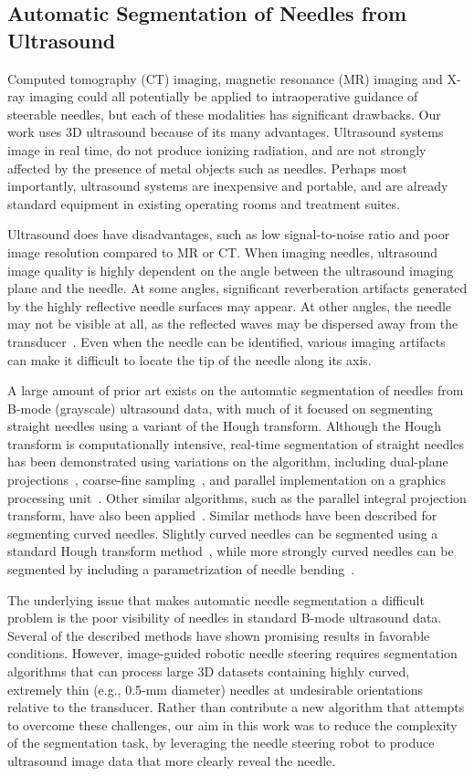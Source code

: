 \subsection{Automatic Segmentation of Needles from Ultrasound}
Computed tomography (CT) imaging, magnetic resonance (MR) imaging and X-ray imaging could all potentially be applied to intraoperative guidance of steerable needles, but each of these modalities has significant drawbacks. Our work uses 3D ultrasound because of its many advantages. Ultrasound systems image in real time, do not produce ionizing radiation, and are not strongly affected by the presence of metal objects such as needles. Perhaps most importantly, ultrasound systems are inexpensive and portable, and are already standard equipment in existing operating rooms and treatment suites.  

Ultrasound does have disadvantages, such as low signal-to-noise ratio and poor image resolution compared to MR or CT. When imaging needles, ultrasound image quality is highly dependent on the angle between the ultrasound imaging plane and the needle. At some angles, significant reverberation artifacts generated by the highly reflective needle surfaces may appear. At other angles, the needle may not be visible at all, as the reflected waves may be dispersed away from the transducer~\cite{Chung2004}. Even when the needle can be identified, various imaging artifacts can make it difficult to locate the tip of the needle along its axis. 

A large amount of prior art exists on the automatic segmentation of needles from B-mode (grayscale) ultrasound data, with much of it focused on segmenting straight needles using a variant of the Hough transform. Although the Hough transform is computationally intensive, real-time segmentation of straight needles has been demonstrated using variations on the algorithm, including dual-plane projections~\cite{Ding2003b}, coarse-fine sampling~\cite{Ding2003a,Zhou2008}, and parallel implementation on a graphics processing unit~\cite{Novotny2007}. Other similar algorithms, such as the parallel integral projection transform, have also been applied~\cite{Barva2008}. Similar methods have been described for segmenting curved needles. Slightly curved needles can be segmented using a standard Hough transform method~\cite{Okazawa2006,Aboofazeli2009}, while more strongly curved needles can be segmented by including a parametrization of needle bending~\cite{Neshat2008,Okazawa2006,Uhercik2010}.

The underlying issue that makes automatic needle segmentation a difficult problem is the poor visibility of needles in standard B-mode ultrasound data. Several of the described methods have shown promising results in favorable conditions. However, image-guided robotic needle steering requires segmentation algorithms that can process large 3D datasets containing highly curved, extremely thin (e.g., 0.5-mm diameter) needles at undesirable orientations relative to the transducer. Rather than contribute a new algorithm that attempts to overcome these challenges, our aim in this work was to reduce the complexity of the segmentation task, by leveraging the needle steering robot to produce ultrasound image data that more clearly reveal the needle.

